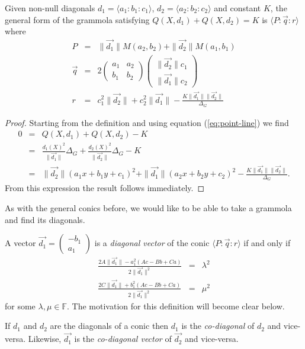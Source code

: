 \begin{theorem} Given non-null diagonals $d_1 = \langle a_1\!:\!b_1\!:\!c_1 \rangle$, $d_2 = \langle a_2\!:\!b_2\!:\!c_2 \rangle$ and constant $K$, the general form of the grammola satisfying $Q(X, d_1) + Q(X, d_2) = K$ is $\langle P\!:\!\vec{q}\!:\!r \rangle$ where
\begin{eqnarray}
P & = & \|\vec{d_1}\|M(a_2, b_2) + \|\vec{d_2}\|M(a_1, b_1)\label{eq:gram-P}\\
\vec{q} & = & 2\begin{pmatrix} a_1 & a_2 \\ b_1 & b_2 \end{pmatrix}\begin{pmatrix} \|\vec{d_2}\|c_1 \\ \|\vec{d_1}\|c_2  \end{pmatrix}\label{eq:gram-q}\\
r & = & c_1^2\|\vec{d_2}\| + c_2^2\|\vec{d_1}\| - \frac{K\|\vec{d_1}\|\|\vec{d_2}\|}{\Delta_G}\label{eq:gram-r}
\end{eqnarray}
\end{theorem}
\begin{proof} Starting from the definition and using equation (\ref{eq:point-line}) we find
\begin{eqnarray*}
0 & = & Q(X, d_1) + Q(X, d_2) - K\\
  & = & \frac{d_1(X)^2}{\|\vec{d_1}\|}\Delta_G + \frac{d_2(X)^2}{\|\vec{d_2}\|}\Delta_G - K\\
  & = & \|\vec{d_2}\|(a_1x + b_1y + c_1)^2 + \|\vec{d_1}\|(a_2x + b_2y + c_2)^2 - \frac{K\|\vec{d_1}\|\|\vec{d_2}\|}{\Delta_G}.
\end{eqnarray*}
From this expression the result follows immediately.
\end{proof}

As with the general conics before, we would like to be able to take a grammola and find its diagonals.

\begin{definition}
A vector $\vec{d_1} = \begin{pmatrix} -b_1 \\ a_1 \end{pmatrix}$ is a \emph{diagonal vector} of the conic $\langle P\!:\!\vec{q}\!:\!r \rangle$ if and only if
\begin{eqnarray}
\frac{2A\|\vec{d_1}\| - a_1^2(Ac - Bb + Ca)}{2\|\vec{d_1}\|^2} & = & \lambda^2\\
\frac{2C\|\vec{d_1}\| + b_1^2(Ac - Bb + Ca)}{2\|\vec{d_1}\|^2} & = & \mu^2
\end{eqnarray}
for some $\lambda, \mu \in \mathbb{F}$. The motivation for this definition will become clear below.
\end{definition}
\begin{definition}
If $d_1$ and $d_2$ are the diagonals of a conic then $d_1$ is the \emph{co-diagonal} of $d_2$ and vice-versa. Likewise, $\vec{d_1}$ is the \emph{co-diagonal vector} of $\vec{d_2}$ and vice-versa.
\end{definition}

